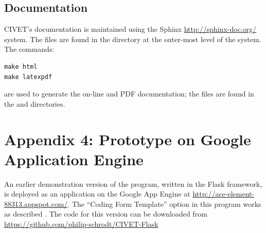 \documentclass[letterpaper,10pt,english]{sphinxmanual}
\begin{document}
\section{Documentation}
\label{appendix3:documentation}
CIVET's documentation is maintained using the Sphinx \href{http://sphinx-doc.org/}{http://sphinx-doc.org/} system.
The files are found in the  directory at the outer-most level of the system.
The commands:

\begin{Verbatim}[commandchars=\\\{\}]
make html
make latexpdf
\end{Verbatim}

are used to generate the on-line and PDF documentation; the files are found in the
 and  directories.


\chapter{Appendix 4: Prototype on Google Application Engine}
\label{appendix4:appendix-4-prototype-on-google-application-engine}\label{appendix4::doc}
An earlier demonstration version of the program, written in the Flask
framework, is deployed as an application on the Google App Engine at
\href{http://ace-element-88313.appspot.com/}{http://ace-element-88313.appspot.com/}. The “Coding Form Template” option
in this program works as described {\hyperref[forms:sec-forms]{\emph{}}}. The code
for this version can be downloaded from \href{https://github.com/philip-schrodt/CIVET-Flask}{https://github.com/philip-schrodt/CIVET-Flask}
\end{document}
